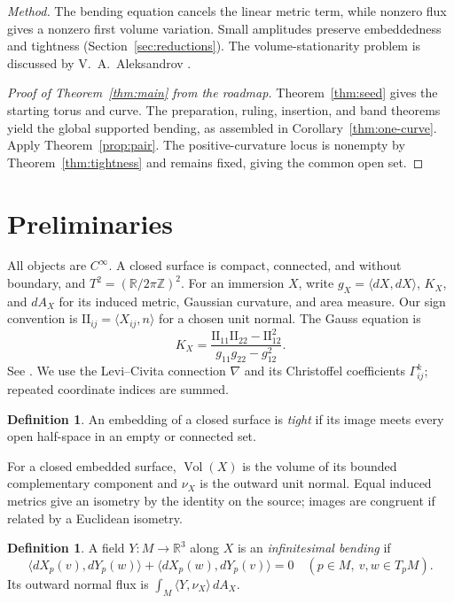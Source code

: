 \documentclass[11pt]{amsart}
\theoremstyle{definition}
\newtheorem{definition}[theorem]{Definition}
\newcommand{\R}{\mathbb R}
\DeclareMathOperator{\Vol}{Vol}
\begin{document}
\emph{Method.} The bending equation cancels the linear metric term,
while nonzero flux gives a nonzero first volume variation.
Small amplitudes preserve embeddedness and tightness
(Section~\ref{sec:reductions}). The volume-stationarity problem is
discussed by V.~A.~Aleksandrov \cite{Aleksandrov}.

\begin{proof}[Proof of Theorem~\ref{thm:main} from the roadmap]
Theorem~\ref{thm:seed} gives the starting torus and curve.
The preparation, ruling, insertion, and band theorems yield the
global supported bending, as assembled in
Corollary~\ref{thm:one-curve}. Apply Theorem~\ref{prop:pair}.
The positive-curvature locus is nonempty by
Theorem~\ref{thm:tightness} and remains fixed, giving the common
open set.
\end{proof}

\section{Preliminaries}\label{sec:preliminaries}

All objects are $C^\infty$. A closed surface is compact, connected,
and without boundary, and $T^2=(\R/2\pi\mathbb Z)^2$.
For an immersion $X$, write $g_X=\langle dX,dX\rangle$, $K_X$,
and $dA_X$ for its induced metric, Gaussian curvature, and area
measure. Our sign convention is
$\mathrm{II}_{ij}=\langle X_{ij},n\rangle$ for a chosen unit normal.
The Gauss equation is
\begin{equation}\label{eq:gauss-curvature}
 K_X=\frac{\mathrm{II}_{11}\mathrm{II}_{22}
                 -\mathrm{II}_{12}^2}{g_{11}g_{22}-g_{12}^2}.
\end{equation}
See \cite[\S3-3 and \S4-3]{doCarmo}. We use the Levi--Civita
connection $\nabla$ and its Christoffel coefficients $\Gamma^k_{ij}$;
repeated coordinate indices are summed.

\begin{definition}\label{def:tight}
An embedding of a closed surface is \emph{tight} if its image meets
every open half-space in an empty or connected set.
\end{definition}

For a closed embedded surface, $\Vol(X)$ is the volume of its bounded
complementary component and $\nu_X$ is the outward unit normal.
Equal induced metrics give an isometry by the identity on the source;
images are congruent if related by a Euclidean isometry.

\begin{definition}\label{def:bending}
A field $Y:M\to\R^3$ along $X$ is an \emph{infinitesimal bending} if
\begin{equation}\label{eq:strain}
 \langle dX_p(v),dY_p(w)\rangle+
 \langle dX_p(w),dY_p(v)\rangle=0
 \quad(p\in M,\ v,w\in T_pM).
\end{equation}
Its outward normal flux is $\int_M\langle Y,\nu_X\rangle\,dA_X$.
\end{definition}
\end{document}
